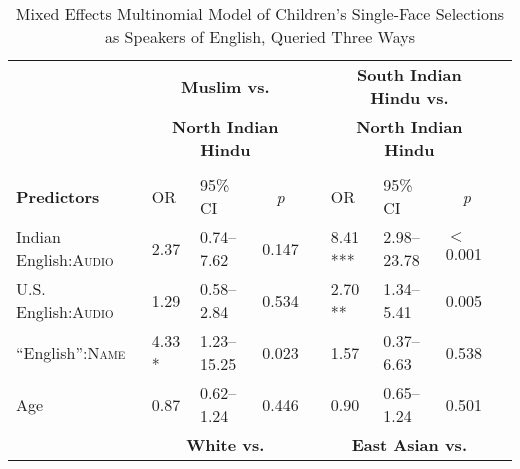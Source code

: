 \begin{table}[ht]
\small
\caption{Mixed Effects Multinomial Model of Children's Single-Face Selections as Speakers of English, Queried Three Ways}\label{tab:engmod}
    \centering
    \vspace{5pt}
    \setlength{\tabcolsep}{1.75pt} 
\begin{threeparttable}
\begin{tabular}{lllrllllr}

 \toprule
& \multicolumn{3}{c}{\textbf{Muslim vs.}} & & \multicolumn{3}{c}{\textbf{South Indian Hindu vs.}}\\
& \multicolumn{3}{c}{\textbf{North Indian Hindu}\tnote{a}} & & \multicolumn{3}{c}{\textbf{North Indian Hindu}\tnote{a}}\\
\cline{2-4} \cline{6-8} \\[-.75em]
\textbf{Predictors} & OR & 95\% CI & \multicolumn{1}{c}{\textit{p}} & & OR & 95\% CI & \multicolumn{1}{c}{\textit{p}} \\ 
\midrule
 Indian English:\textsc{Audio} & 2.37 & 0.74--7.62 & 0.147 &  & 8.41 *** & 2.98--23.78 & $<$0.001 \\ 
 U.S. English:\textsc{Audio} & 1.29 & 0.58--2.84 & 0.534 &  & 2.70 ** & 1.34--5.41 & 0.005 \\ 
 ``English'':\textsc{Name} & 4.33 * & 1.23--15.25 & 0.023 &  & 1.57 & 0.37--6.63 & 0.538 \\ 
 Age\tnote{b} & 0.87 & 0.62--1.24 & 0.446 &  & 0.90 & 0.65--1.24 & 0.501 \\ 
\midrule
& 
\multicolumn{3}{c}{\textbf{White vs.}} & &
\multicolumn{3}{c}{\textbf{East Asian vs.}}\\


\end{tabular}
\end{threeparttable}
\end{table}
